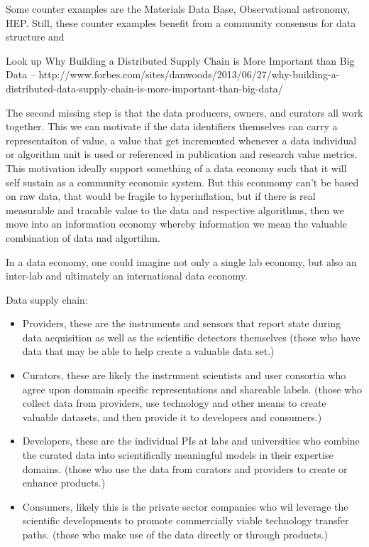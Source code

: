 \documentclass{article}
\begin{document}
Some counter examples are the Materials Data Base, Observational astronomy, HEP.  Still, these counter examples benefit from a community consensus for data structure and 

Look up Why Building a Distributed Supply Chain is More Important than Big Data -- http://www.forbes.com/sites/danwoods/2013/06/27/why-building-a-distributed-data-supply-chain-is-more-important-than-big-data/

The second missing step is that the data producers, owners, and curators all work together.  This we can motivate if the data identifiers themselves can carry a representaiton of value, a value that get incremented whenever a data individual or algorithm unit is used or referenced in publication and research value metrics.
This motivation ideally support something of a data economy such that it will self sustain as a community economic system.  But this econmomy can't be based on raw data, that would be fragile to hyperinflation, but if there is real measurable and tracable value to the data and respective algorithms, then we move into an information economy whereby information we mean the valuable combination of data nad algortihm.




In a data economy, one could imagine not only a single lab economy, but also an inter-lab and ultimately an international data economy.

Data supply chain:
\begin{itemize}
\item Providers, these are the instruments and sensors that report state during data acquisition as well as the scientific detectors themselves (those who have data that may be able to help create a valuable data set.)
\item Curators, these are likely the instrument scientists and user consortia who agree upon dommain specific representations and shareable labels. (those who collect data from providers, use technology and other means to create valuable datasets, and then provide it to developers and consumers.)
\item Developers, these are the individual PIs at labs and universities who combine the curated data into scientifically meaningful models in their expertise domains. (those who use the data from curators and providers to create or enhance products.)
\item Consumers, likely this is the private sector companies who wil leverage the scientific developments to promote commercially viable technology transfer paths. (those who make use of the data directly or through products.)
\end{itemize}
\end{document}
